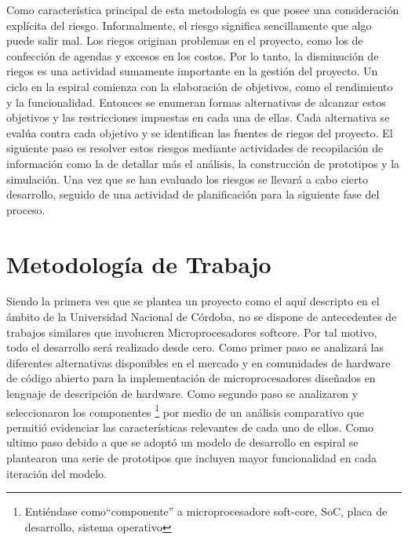 Como característica principal de esta metodología es que posee una
consideración explícita del riesgo. Informalmente, el riesgo significa
sencillamente que algo puede salir mal. Los riegos originan problemas
en el proyecto, como los de confección de agendas y excesos en los
costos. Por lo tanto, la disminución de riegos es una actividad
sumamente importante en la gestión del proyecto. Un ciclo en la
espiral comienza con la elaboración de objetivos, como el rendimiento
y la funcionalidad. Entonces se enumeran formas alternativas de
alcanzar estos objetivos y las restricciones impuestas en cada una de
ellas. Cada alternativa se evalúa contra cada objetivo y se
identifican las fuentes de riegos del proyecto. El siguiente paso es
resolver estos riesgos mediante actividades de recopilación de
información como la de detallar más el análisis, la construcción de
prototipos y la simulación. Una vez que se han evaluado los riesgos se
llevará a cabo cierto desarrollo, seguido de una actividad de
planificación para la siguiente fase del proceso.

\section{Metodología de Trabajo}

Siendo la primera ves que se plantea un proyecto como el aquí
descripto en el ámbito de la Universidad Nacional de Córdoba, no se
dispone de antecedentes de trabajos similares que involucren
Microprocesadores softcore. Por tal motivo, todo el desarrollo será
realizado desde cero. Como primer paso se analizará las diferentes
alternativas disponibles en el mercado y en comunidades de hardware de
código abierto para la implementación de microprocesadores diseñados
en lenguaje de descripción de hardware. Como segundo paso 
se analizaron y seleccionaron los componentes \footnote{Entiéndase como``componente'' a 
microprocesadore soft-core, SoC, placa de desarrollo, sistema operativo} 
por medio de un análisis comparativo que permitió evidenciar las características relevantes de
cada uno de ellos. Como ultimo paso debido a que se adoptó un modelo de desarrollo en espiral 
se plantearon una serie de prototipos que incluyen mayor funcionalidad en cada iteración del modelo.


